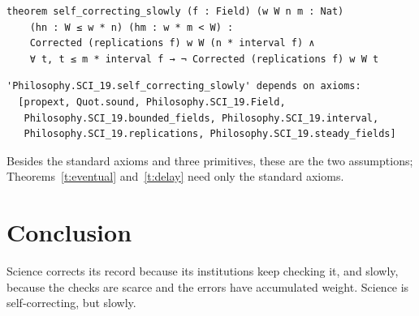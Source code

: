 \documentclass{situationist-preprint}
\begin{document}
\begin{lstlisting}
theorem self_correcting_slowly (f : Field) (w W n m : Nat)
    (hn : W ≤ w * n) (hm : w * m < W) :
    Corrected (replications f) w W (n * interval f) ∧
    ∀ t, t ≤ m * interval f → ¬ Corrected (replications f) w W t
\end{lstlisting}

\begin{lstlisting}
'Philosophy.SCI_19.self_correcting_slowly' depends on axioms:
  [propext, Quot.sound, Philosophy.SCI_19.Field,
   Philosophy.SCI_19.bounded_fields, Philosophy.SCI_19.interval,
   Philosophy.SCI_19.replications, Philosophy.SCI_19.steady_fields]
\end{lstlisting}

Besides the standard axioms and three primitives, these are the two assumptions; Theorems~\ref{t:eventual} and~\ref{t:delay} need only the standard axioms.

\section{Conclusion}

Science corrects its record because its institutions keep checking it, and slowly, because the checks are scarce and the errors have accumulated weight. Science is self-correcting, but slowly.
\end{document}
